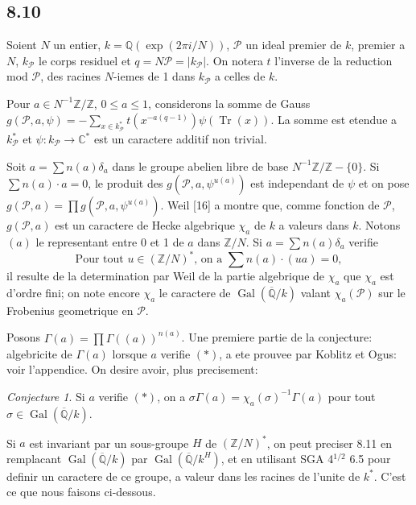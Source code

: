 \documentclass[12pt,a4paper]{article}
\theoremstyle{plain}
\theoremstyle{definition}
\theoremstyle{remark}
\newtheorem{conjecture}[definition]{Conjecture}
\DeclareMathOperator{\Gal}{Gal}
\DeclareMathOperator{\Tr}{Tr}
\newcommand{\Q}{\mathbb{Q}}
\newcommand{\C}{\mathbb{C}}
\newcommand{\Z}{\mathbb{Z}}
\begin{document}
\subsection*{8.10}

Soient $N$ un entier, $k = \Q(\exp(2\pi i/N))$, $\mathcal{P}$ un ideal premier de $k$, premier
a $N$, $k_\mathcal{P}$ le corps residuel et $q = N\mathcal{P} = |k_\mathcal{P}|$. On notera $t$ l'inverse de la reduction
mod $\mathcal{P}$, des racines $N$-iemes de 1 dans $k_\mathcal{P}$ a celles de $k$.

Pour $a \in N^{-1}\Z/\Z$, $0 \leq a \leq 1$, considerons la somme de Gauss
$g(\mathcal{P}, a, \psi) = -\sum_{x \in k_\mathcal{P}^*} t(x^{-a(q-1)}) \psi(\Tr(x))$. La somme est etendue a
$k_\mathcal{P}^*$ et $\psi: k_\mathcal{P} \to \C^*$ est un caractere additif non trivial.

Soit $a = \sum n(a) \delta_a$ dans le groupe abelien libre de base $N^{-1}\Z/\Z - \{0\}$. Si
$\sum n(a) \cdot a = 0$, le produit des $g(\mathcal{P}, a, \psi^{u(a)})$ est independant de $\psi$ et on pose
$g(\mathcal{P}, a) = \prod g(\mathcal{P}, a, \psi^{u(a)})$. Weil [16] a montre que, comme fonction de $\mathcal{P}$,
$g(\mathcal{P}, a)$ est un caractere de Hecke algebrique $\chi_a$ de $k$ a valeurs dans $k$. Notons
$(a)$ le representant entre 0 et 1 de $a$ dans $\Z/N$. Si $a = \sum n(a) \delta_a$ verifie
\begin{equation}\label{eq:star}
\text{Pour tout } u \in (\Z/N)^*\text{, on a } \sum n(a) \cdot (ua) = 0,\tag{$*$}
\end{equation}
il resulte de la determination par Weil de la partie algebrique de $\chi_a$ que
$\chi_a$ est d'ordre fini; on note encore $\chi_a$ le caractere de $\Gal(\overline{\Q}/k)$ valant
$\chi_a(\mathcal{P})$ sur le Frobenius geometrique en $\mathcal{P}$.

Posons $\Gamma(a) = \prod \Gamma((a))^{n(a)}$. Une premiere partie de la conjecture:
algebricite de $\Gamma(a)$ lorsque $a$ verifie $(*)$, a ete prouvee par Koblitz et Ogus:
voir l'appendice. On desire avoir, plus precisement:

\begin{conjecture}\label{conj:8.11}
Si $a$ verifie $(*)$, on a $\sigma \Gamma(a) = \chi_a(\sigma)^{-1} \Gamma(a)$ pour tout
$\sigma \in \Gal(\overline{\Q}/k)$.
\end{conjecture}

Si $a$ est invariant par un sous-groupe $H$ de $(\Z/N)^*$, on peut preciser 8.11 en
remplacant $\Gal(\overline{\Q}/k)$ par $\Gal(\overline{\Q}/k^H)$, et en utilisant SGA 4$^{1/2}$ 6.5 pour definir un
caractere de ce groupe, a valeur dans les racines de l'unite de $k^*$. C'est ce que nous
faisons ci-dessous.
\end{document}
